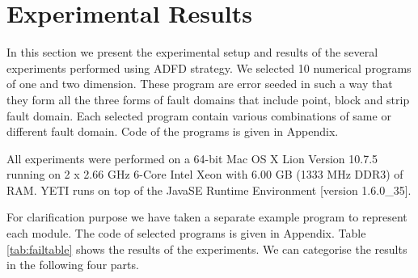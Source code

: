 \documentclass[runningheads,a4paper]{llncs}
\begin{document}




\section{Experimental Results} \label{sec:experimentalResults}
In this section we present the experimental setup and results of the several experiments performed using ADFD strategy. We selected 10 numerical programs of one and two dimension. These program are error seeded in such a way that they form all the three forms of fault domains that include point, block and strip fault domain. Each selected program contain various combinations of same or different fault domain. Code of the programs is given in Appendix. 

All experiments were performed on a 64-bit Mac OS X Lion Version 10.7.5 running on 2 x 2.66 GHz 6-Core Intel Xeon with 6.00 GB (1333 MHz DDR3) of RAM. YETI runs on top of the Java\texttrademark  SE Runtime Environment [version 1.6.0\_35]. 

For clarification purpose we have taken a separate example program to represent each module. The code of selected programs is given in Appendix. Table \ref{tab:failtable} shows the results of the experiments. We can categorise the results in the following four parts.\\


\end{document}
